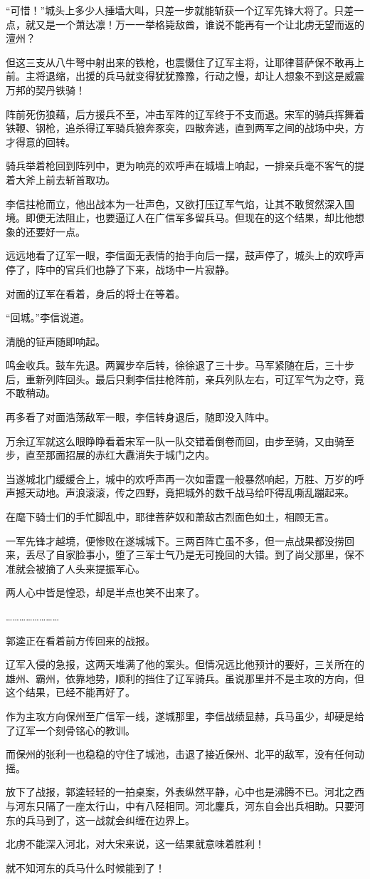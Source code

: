 “可惜！”城头上多少人捶墙大叫，只差一步就能斩获一个辽军先锋大将了。只差一点，就又是一个萧达凛！万一一举格毙敌酋，谁说不能再有一个让北虏无望而返的澶州？

但这三支从八牛弩中射出来的铁枪，也震慑住了辽军主将，让耶律菩萨保不敢再上前。主将退缩，出援的兵马就变得犹犹豫豫，行动之慢，却让人想象不到这是威震万邦的契丹铁骑！

阵前死伤狼藉，后方援兵不至，冲击军阵的辽军终于不支而退。宋军的骑兵挥舞着铁鞭、钢枪，追杀得辽军骑兵狼奔豕突，四散奔逃，直到两军之间的战场中央，方才得意的回转。

骑兵举着枪回到阵列中，更为响亮的欢呼声在城墙上响起，一排亲兵毫不客气的提着大斧上前去斩首取功。

李信拄枪而立，他出战本为一壮声色，又欲打压辽军气焰，让其不敢贸然深入国境。即便无法阻止，也要逼辽人在广信军多留兵马。但现在的这个结果，却比他想象的还要好一点。

远远地看了辽军一眼，李信面无表情的抬手向后一摆，鼓声停了，城头上的欢呼声停了，阵中的官兵们也静了下来，战场中一片寂静。

对面的辽军在看着，身后的将士在等着。

“回城。”李信说道。

清脆的钲声随即响起。

鸣金收兵。鼓车先退。两翼步卒后转，徐徐退了三十步。马军紧随在后，三十步后，重新列阵回头。最后只剩李信拄枪阵前，亲兵列队左右，可辽军气为之夺，竟不敢稍动。

再多看了对面浩荡敌军一眼，李信转身退后，随即没入阵中。

万余辽军就这么眼睁睁看着宋军一队一队交错着倒卷而回，由步至骑，又由骑至步，直至那面招展的赤红大纛消失于城门之内。

当遂城北门缓缓合上，城中的欢呼声再一次如雷霆一般暴然响起，万胜、万岁的呼声撼天动地。声浪滚滚，传之四野，竟把城外的数千战马给吓得乱嘶乱蹦起来。

在麾下骑士们的手忙脚乱中，耶律菩萨奴和萧敌古烈面色如土，相顾无言。

一军先锋才越境，便惨败在遂城城下。三两百阵亡虽不多，但一点战果都没捞回来，丢尽了自家脸事小，堕了三军士气乃是无可挽回的大错。到了尚父那里，保不准就会被摘了人头来提振军心。

两人心中皆是惶恐，却是半点也笑不出来了。

……………………

郭逵正在看着前方传回来的战报。

辽军入侵的急报，这两天堆满了他的案头。但情况远比他预计的要好，三关所在的雄州、霸州，依靠地势，顺利的挡住了辽军骑兵。虽说那里并不是主攻的方向，但这个结果，已经不能再好了。

作为主攻方向保州至广信军一线，遂城那里，李信战绩显赫，兵马虽少，却硬是给了辽军一个刻骨铭心的教训。

而保州的张利一也稳稳的守住了城池，击退了接近保州、北平的敌军，没有任何动摇。

放下了战报，郭逵轻轻的一拍桌案，外表纵然平静，心中也是沸腾不已。河北之西与河东只隔了一座太行山，中有八陉相同。河北鏖兵，河东自会出兵相助。只要河东的兵马到了，这一战就会纠缠在边界上。

北虏不能深入河北，对大宋来说，这一结果就意味着胜利！

就不知河东的兵马什么时候能到了！

